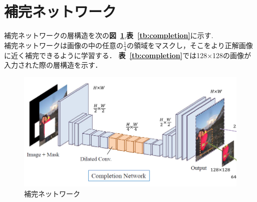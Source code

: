 \documentclass[a4j, 11pt]{jreport}
\newcommand{\figref}[1]{\textbf{図~\ref{#1}}}
\newcommand{\tabref}[1]{\textbf{表~\ref{#1}}}
\begin{document}
\section{補完ネットワーク}
補完ネットワークの層構造を次の\figref{fig:completion},\tabref{tb:completion}に示す.\\
補完ネットワークは画像の中の任意の$\frac{1}{4}$の領域をマスクし，そこをより正解画像に近く補完できるように学習する．
\tabref{tb:completion}では128×128の画像が入力された際の層構造を示す．
\begin{figure}[H]
	\centering
	\includegraphics[width=\linewidth]{images/old-study/completion_network.png}
	\caption{補完ネットワーク}
	\label{fig:completion}
\end{figure}
\end{document}
